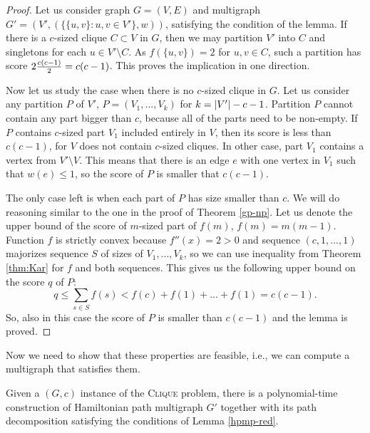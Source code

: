 \begin{proof}
Let us consider graph $G=(V,E)$ and multigraph $G'=(V',(\{\{u,v\}: u,v \in V'\},w))$,
satisfying the condition of the lemma.
If there is a $c$-sized clique $C \subset V$ in $G$,
then we may partition $V'$ into $C$ and singletons for each $u \in V' \setminus C$.
As $f(\{u,v\})=2$ for $u,v \in C$, such a partition has score $2 {c(c-1) \over 2} = c(c-1)$.
This proves the implication in one direction.

Now let us study the case when there is no $c$-sized clique in $G$.
Let us consider any partition $P$ of $V'$, $P=(V_1, ..., V_k)$ for $k = \left\vert V' \right\vert-c-1$.
Partition $P$ cannot contain any part bigger than $c$,
because all of the parts need to be non-empty.
If $P$ contains $c$-sized part $V_1$ included entirely in $V$, then its score is less than $c(c-1)$,
for $V$ does not contain $c$-sized cliques.
In other case, part $V_1$ contains a vertex from $V' \setminus V$.
This means that there is an edge $e$ with one vertex in $V_1$ such that $w(e) \leq 1$,
so the score of $P$ is smaller that $c(c-1)$.

The only case left is when each part of $P$ has size smaller than $c$.
We will do reasoning similar to the one in the proof of Theorem \ref{gp-np}.
Let us denote the upper bound of the score of $m$-sized part of $f(m)$, $f(m) = m(m-1)$.
Function $f$ is strictly convex because $f''(x) = 2 > 0$
and sequence $(c,1,...,1)$ majorizes sequence $S$ of sizes of $V_1, ..., V_k$,
so we can use inequality from Theorem \ref{thm:Kar}
for $f$ and both sequences.
This gives us the following upper bound on the score $q$ of $P$:
$$q \leq \sum_{s \in S} f(s) < f(c) + f(1) + ... + f(1) = c(c-1) \text{.}$$
So, also in this case the score of $P$ is smaller than $c(c-1)$ and the lemma is proved.
\end{proof}

Now we need to show that these properties are feasible,
i.e., we can compute a multigraph that satisfies them.

\begin{lmm} \label{hpmp-red-2}
Given a $(G, c)$ instance of the \textsc{Clique} problem,
there is a polynomial-time construction
of Hamiltonian path multigraph $G'$ together with its path decomposition
satisfying the conditions of Lemma \ref{hpmp-red}.
\end{lmm}

